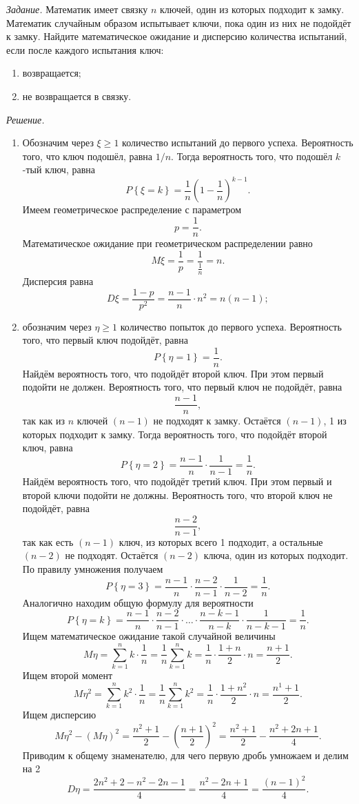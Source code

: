 \textit{Задание.} Математик имеет связку $n$ ключей, один из которых подходит к замку.
Математик случайным образом испытывает ключи, пока один из них не подойдёт к замку.
Найдите математическое ожидание и дисперсию количества испытаний, если после каждого испытания ключ:
\begin{enumerate}[label=\alph*)]
\item возвращается;
\item не возвращается в связку.
\end{enumerate}

\textit{Решение.}
\begin{enumerate}[label=\alph*)]
\item Обозначим через $ \xi \geq 1$ количество испытаний до первого успеха.
Вероятность того, что ключ подошёл, равна $1/n$.
Тогда вероятность того, что подошёл $k$-тый ключ, равна
$$P \left\{ \xi = k \right\} =
\frac{1}{n} \left( 1 - \frac{1}{n} \right)^{k-1}.$$
Имеем геометрическое распределение с параметром
$$p = \frac{1}{n}.$$
Математическое ожидание при геометрическом распределении равно
$$M \xi =
\frac{1}{p} =
\frac{1}{ \frac{1}{n}} =
n.$$
Дисперсия равна
$$D \xi =
\frac{1-p}{p^2} =
\frac{n-1}{n} \cdot n^2 =
n \left( n-1 \right);$$
\item обозначим через $ \eta \geq 1$ количество попыток до первого успеха.
Вероятность того, что первый ключ подойдёт, равна
$$P \left\{ \eta = 1 \right\} =
\frac{1}{n}.$$
Найдём вероятность того, что подойдёт второй ключ.
При этом первый подойти не должен.
Вероятность того, что первый ключ не подойдёт, равна
$$ \frac{n-1}{n},$$
так как из $n$ ключей $ \left( n-1 \right) $ не подходят к замку.
Остаётся $ \left( n-1 \right) $, 1 из которых подходит к замку. 
Тогда вероятность того, что подойдёт второй ключ, равна
$$P \left\{ \eta = 2 \right\} =
\frac{n-1}{n} \cdot \frac{1}{n-1} =
\frac{1}{n}.$$
Найдём вероятность того, что подойдёт третий ключ.
При этом первый и второй ключи подойти не должны.
Вероятность того, что второй ключ не подойдёт, равна
$$ \frac{n-2}{n-1},$$
так как есть $ \left( n-1 \right) $ ключ, из которых всего 1 подходит, а остальные $ \left( n-2 \right) $ не подходят.
Остаётся $ \left( n-2 \right) $ ключа, один из которых подходит.
По правилу умножения получаем
$$P \left\{ \eta = 3 \right\} =
\frac{n-1}{n} \cdot \frac{n-2}{n-1} \cdot \frac{1}{n-2} =
\frac{1}{n}.$$
Аналогично находим общую формулу для вероятности
$$P \left\{ \eta = k \right\} =
\frac{n-1}{n} \cdot \frac{n-2}{n-1} \cdot \dotsc \cdot \frac{n-k-1}{n-k} \cdot \frac{1}{n-k-1} =
\frac{1}{n}.$$
Ищем математическое ожидание такой случайной величины
$$M \eta =
\sum \limits_{k=1}^n k \cdot \frac{1}{n} =
\frac{1}{n} \sum \limits_{k=1}^n k =
\frac{1}{n} \cdot \frac{1+n}{2} \cdot n =
\frac{n+1}{2}.$$
Ищем второй момент
$$M \eta^2 =
\sum \limits_{k=1}^n k^2 \cdot \frac{1}{n} =
\frac{1}{n} \sum \limits_{k=1}^n k^2 =
\frac{1}{n} \cdot \frac{1+n^2}{2} \cdot n =
\frac{n^1 + 1}{2}.$$
Ищем дисперсию
$$
M \eta^2 - \left( M \eta \right)^2 =
\frac{n^2 + 1}{2} - \left( \frac{n+1}{2} \right)^2 =
\frac{n^2 + 1}{2} - \frac{n^2 + 2n + 1}{4}.$$
Приводим к общему знаменателю, для чего первую дробь умножаем и делим на 2
$$D \eta =
\frac{2n^2 + 2 - n^2 - 2n - 1}{4} =
\frac{n^2 - 2n + 1}{4} =
\frac{ \left( n-1 \right)^2}{4}.$$
\end{enumerate}

